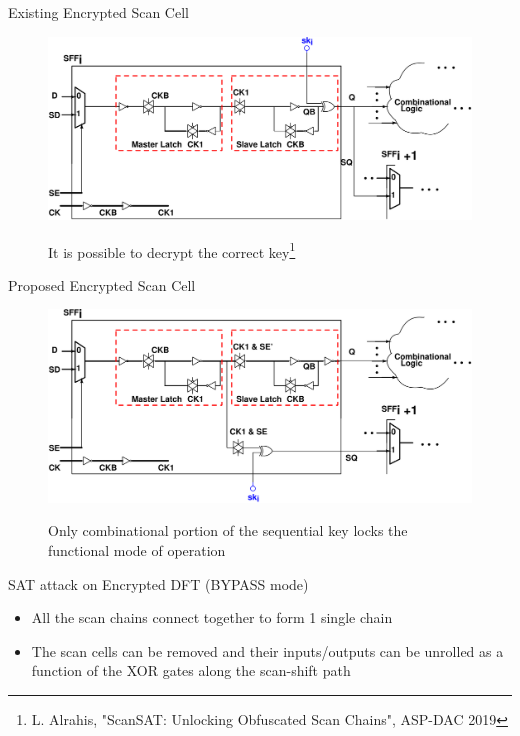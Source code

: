 \begin{frame}{Existing Encrypted Scan Cell}
\begin{figure}
\begin{center}
\label{fig:encrypted-sc}
\includegraphics[scale=0.2]{fig/encrypted-scanflop.pdf}
\caption{It is possible to decrypt the correct key\footnote{L. Alrahis, "ScanSAT: Unlocking Obfuscated Scan Chains", ASP-DAC 2019}}
\end{center}
\end{figure}
\end{frame}

\begin{frame}{Proposed Encrypted Scan Cell}
\begin{figure}
\begin{center}
\label{fig:encrypted-sc}
\includegraphics[scale=0.2]{fig/encrypted-scanflop-2.pdf}
\caption{Only combinational portion of the sequential key locks the functional mode of operation}
\end{center}
\end{figure}
\end{frame}


\begin{frame}{SAT attack on Encrypted DFT (BYPASS mode)}
\begin{itemize}
	\item All the scan chains connect together to form 1 single chain
	\item The scan cells can be removed and their inputs/outputs can be unrolled as a function of the XOR gates along the scan-shift path
\end{itemize}
\end{frame}

